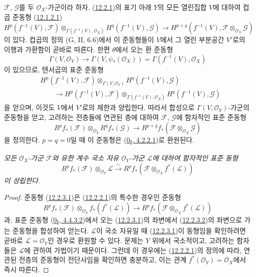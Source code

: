 \begin{env}[12.2.2]
\label{0.12.2.2-fr}
$\mathcal F$, $\mathcal G$를 두 $\mathcal O_X$-가군이라 하자.
(\hyperref[0.12.2.1-fr]{12.2.1})의 표기 아래 $Y$의 모든 열린집합
$V$에 대하여 컵곱 준동형 (\hyperref[0.12.1.2.1-fr]{12.1.2.1})
\[
H^p(f^{-1}(V),\mathcal F)
\otimes_{\Gamma(f^{-1}(V),\mathcal O_X)}
H^q(f^{-1}(V),\mathcal G)
\longrightarrow
H^{p+q}(f^{-1}(V),\mathcal F\otimes_{\mathcal O_X}\mathcal G)
\]
이 있다.
컵곱의 정의 (G, II, 6.6)에서 이 준동형들이 $V$에서 그 열린
부분공간 $V'$로의 이행과 가환함이 곧바로 따른다. 한편 $\theta$에서
오는 환 준동형
\[
\Gamma(V,\mathcal O_Y)\longrightarrow\Gamma(V,\psi_*(\mathcal O_X))
=\Gamma(f^{-1}(V),\mathcal O_X)
\]
이 있으므로, 텐서곱의 표준 준동형
\[
\begin{aligned}
&H^p(f^{-1}(V),\mathcal F)\otimes_{\Gamma(V,\mathcal O_Y)}
H^q(f^{-1}(V),\mathcal G)\\
&\qquad\longrightarrow
H^p(f^{-1}(V),\mathcal F)
\otimes_{\Gamma(f^{-1}(V),\mathcal O_X)}
H^q(f^{-1}(V),\mathcal G)
\end{aligned}
\]
을 얻으며, 이것도 $V$에서 $V'$로의 제한과 양립한다. 따라서 합성으로
$\Gamma(V,\mathcal O_Y)$-가군의 준동형을 얻고, 고려하는 전층들에
연관된 층에 대하여 $\mathcal F$, $\mathcal G$에 함자적인 표준 준동형
\[
\label{0.12.2.2.1-fr}
\tag{12.2.2.1}
R^p f_*(\mathcal F)\otimes_{\mathcal O_Y}R^q f_*(\mathcal G)
\longrightarrow
R^{p+q}f_*(\mathcal F\otimes_{\mathcal O_X}\mathcal G)
\]
을 정의한다. $p=q=0$일 때 이 준동형은
(\hyperref[0.4.2.2.1-ko]{0\textsubscript{I}, 4.2.2.1})로 환원된다.
\end{env}

\begin{proposition}[12.2.3]
\label{0.12.2.3-fr}
\emph{모든 $\mathcal O_X$-가군 $\mathcal F$와 유한 계수 국소 자유
$\mathcal O_Y$-가군 $\mathcal L$에 대하여 함자적인 표준 동형
\[
\label{0.12.2.3.1-fr}
\tag{12.2.3.1}
R^p f_*(\mathcal F)\otimes_{\mathcal O_Y}\mathcal L
\xrightarrow{\sim}
R^p f_*(\mathcal F\otimes_{\mathcal O_X}f^*(\mathcal L))
\]
이 성립한다.}
\end{proposition}

\begin{proof}
준동형 (\hyperref[0.12.2.3.1-fr]{12.2.3.1})은
(\hyperref[0.12.2.2.1-fr]{12.2.2.1})의 특수한 경우인 준동형
\[
\label{0.12.2.3.2-fr}
\tag{12.2.3.2}
R^p f_*(\mathcal F)\otimes_{\mathcal O_Y}f_*(f^*(\mathcal L))
\longrightarrow
R^p f_*(\mathcal F\otimes_{\mathcal O_X}f^*(\mathcal L))
\]
과, 표준 준동형
(\hyperref[0.4.4.3.2-ko]{0\textsubscript{I}, 4.4.3.2})에서 오는
(\hyperref[0.12.2.3.1-fr]{12.2.3.1})의 좌변에서
(\hyperref[0.12.2.3.2-fr]{12.2.3.2})의 좌변으로 가는 준동형을
합성하여 얻는다. $\mathcal L$이 국소 자유일 때
(\hyperref[0.12.2.3.1-fr]{12.2.3.1})이 동형임을 확인하려면 곧바로
$\mathcal L=\mathcal O_Y$인 경우로 환원할 수 있다. 문제는 $Y$ 위에서
국소적이고, 고려하는 함자들은 $\mathcal L$에 관하여 가법이기 때문이다.
그런데 이 경우에는 (\hyperref[0.12.2.2.1-fr]{12.2.2.1})의 정의에 따라,
연관된 전층의 준동형이 전단사임을 확인하면 충분하고, 이는 관계
$f^*(\mathcal O_Y)=\mathcal O_X$에서 즉시 따른다.
\end{proof}

